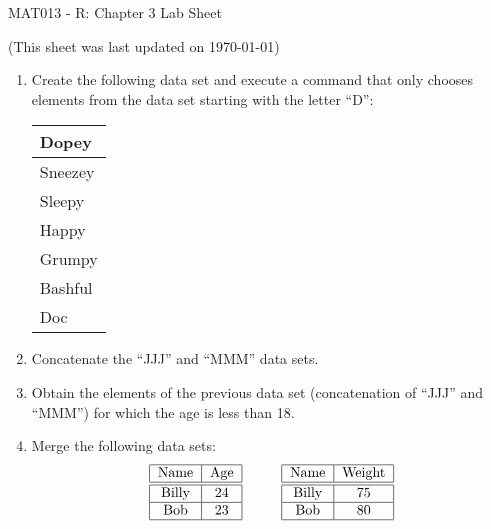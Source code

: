 \documentclass[12pt]{article}
\begin{document}
\begin{center}
\huge{MAT013 - R: Chapter 3 Lab Sheet}\\
\begin{center}
\tiny{(This sheet was last updated on \today)}
\end{center}
\end{center}

\begin{enumerate}
\item Create the following data set and execute a command that only chooses elements from the data set starting with the letter ``D'':
\begin{center}
\begin{tabular}{|l|}
\hline
Dopey\\
\hline
Sneezey\\
\hline
Sleepy\\
\hline
Happy\\
\hline
Grumpy\\
\hline
Bashful\\
\hline
Doc\\
\hline
\end{tabular}
\end{center}
\item Concatenate the ``JJJ'' and ``MMM'' data sets.
\item Obtain the elements of the previous data set (concatenation of ``JJJ'' and ``MMM'') for which the age is less than 18.
\item Merge the following data sets:
$$\begin{array}{c@{\hspace{1cm}}c}
\begin{tabular}{|c|c|}
\hline
Name&Age\\\hline\hline
Billy&24\\\hline
Bob&23\\\hline
\end{tabular}&
\begin{tabular}{|c|c|}
\hline
Name&Weight\\\hline\hline
Billy&75\\\hline
Bob&80\\\hline
\end{tabular}\end{array}
$$
 

\end{enumerate}
\end{document}
